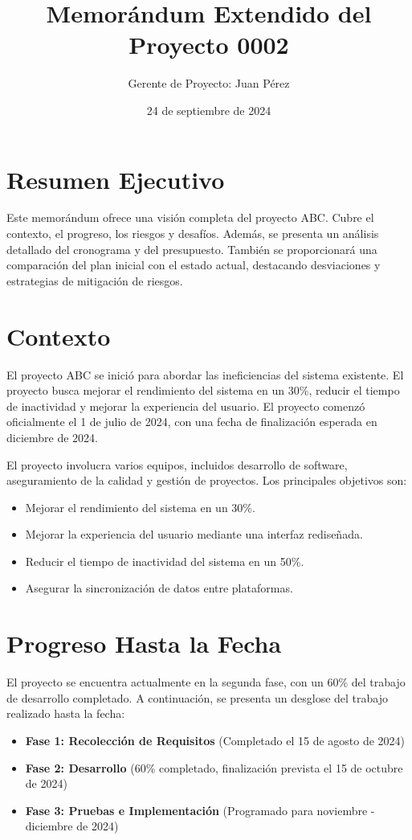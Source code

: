 \documentclass[12pt]{article}
\title{Memorándum Extendido del Proyecto 0002}
\author{Gerente de Proyecto: Juan Pérez}
\date{24 de septiembre de 2024}
\begin{document}
\maketitle

\tableofcontents
\newpage

\section{Resumen Ejecutivo}
Este memorándum ofrece una visión completa del proyecto ABC. Cubre el contexto, el progreso, los riesgos y desafíos. Además, se presenta un análisis detallado del cronograma y del presupuesto. También se proporcionará una comparación del plan inicial con el estado actual, destacando desviaciones y estrategias de mitigación de riesgos.

\section{Contexto}
El proyecto ABC se inició para abordar las ineficiencias del sistema existente. El proyecto busca mejorar el rendimiento del sistema en un 30\%, reducir el tiempo de inactividad y mejorar la experiencia del usuario. El proyecto comenzó oficialmente el 1 de julio de 2024, con una fecha de finalización esperada en diciembre de 2024.

El proyecto involucra varios equipos, incluidos desarrollo de software, aseguramiento de la calidad y gestión de proyectos. Los principales objetivos son:
\begin{itemize}
    \item Mejorar el rendimiento del sistema en un 30\%.
    \item Mejorar la experiencia del usuario mediante una interfaz rediseñada.
    \item Reducir el tiempo de inactividad del sistema en un 50\%.
    \item Asegurar la sincronización de datos entre plataformas.
\end{itemize}

\section{Progreso Hasta la Fecha}
El proyecto se encuentra actualmente en la segunda fase, con un 60\% del trabajo de desarrollo completado. A continuación, se presenta un desglose del trabajo realizado hasta la fecha:

\begin{itemize}
    \item \textbf{Fase 1: Recolección de Requisitos} (Completado el 15 de agosto de 2024)
    \item \textbf{Fase 2: Desarrollo} (60\% completado, finalización prevista el 15 de octubre de 2024)
    \item \textbf{Fase 3: Pruebas e Implementación} (Programado para noviembre - diciembre de 2024)
\end{itemize}
\end{document}
